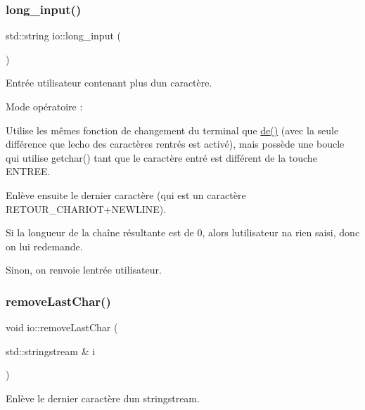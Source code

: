 \subsubsection{\texorpdfstring{long\+\_\+input()}{long\_input()}}
{\footnotesize\ttfamily std\+::string io\+::long\+\_\+input (\begin{DoxyParamCaption}{ }\end{DoxyParamCaption})}



Entrée utilisateur contenant plus d\textquotesingle{}un caractère. 

Mode opératoire \+:
\begin{DoxyItemize}
\item Utilise les mêmes fonction de changement du terminal que {\ttfamily \hyperlink{namespaceio_ae9908b55f26f07e78043d7cfad003d22}{de()}} (avec la seule différence que l\textquotesingle{}echo des caractères rentrés est activé), mais possède une boucle qui utilise {\ttfamily getchar()} tant que le caractère entré est différent de la touche {\ttfamily E\+N\+T\+R\+EE}.
\item Enlève ensuite le dernier caractère (qui est un caractère {\ttfamily R\+E\+T\+O\+U\+R\+\_\+\+C\+H\+A\+R\+I\+OT}+{\ttfamily N\+E\+W\+L\+I\+NE}).
\begin{DoxyItemize}
\item Si la longueur de la chaîne résultante est de 0, alors l\textquotesingle{}utilisateur n\textquotesingle{}a rien saisi, donc on lui redemande.
\item Sinon, on renvoie l\textquotesingle{}entrée utilisateur. 
\end{DoxyItemize}
\end{DoxyItemize}\mbox{\label{namespaceio_a0ed486192687092d372440a79c3a65a3}} 
\subsubsection{\texorpdfstring{remove\+Last\+Char()}{removeLastChar()}}
{\footnotesize\ttfamily void io\+::remove\+Last\+Char (\begin{DoxyParamCaption}\item[{std\+::stringstream \&}]{i }\end{DoxyParamCaption})}



Enlève le dernier caractère d\textquotesingle{}un stringstream. 

